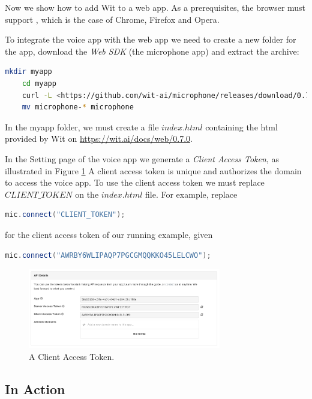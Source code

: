 \documentclass[twoside,11pt]{article}
\begin{document}
Now we show how to add Wit to a web app.
As a prerequisites, the browser must support \cite{webrtc}, which is the case of Chrome, Firefox and Opera.

To integrate the voice app with the web app we need to create a new folder for the app, download the \emph{Web SDK} (the microphone app) and extract the archive:
\begin{lstlisting}[language=bash]
	mkdir myapp
	cd myapp
	curl -L <https://github.com/wit-ai/microphone/releases/download/0.7.0/microphone-0.7.0.tar.gz | tar xvzf -
	mv microphone-* microphone
\end{lstlisting}

In the myapp folder, we must create a file $index.html$ containing the html provided by Wit on \url{https://wit.ai/docs/web/0.7.0}.

In the Setting page of the voice app we generate a \emph{Client Access Token}, as illustrated in Figure \ref{fig:token} 
A client access token is unique and authorizes the domain to access the voice app. 
To use the client access token we must replace $CLIENT\_TOKEN$ on the $index.html$ file.
For example, replace 
\begin{lstlisting}[language=java]
	mic.connect("CLIENT_TOKEN");
\end{lstlisting}
for the client access token of our running example, given
\begin{lstlisting}[language=java]
	mic.connect("AWRBY6WLIPAQP7PGCGMQQKKO45LELCWO");
\end{lstlisting}

\begin{figure}[!h]
\begin{center}
    \includegraphics[width=0.75\textwidth]{figures/token.png}
    \caption{A Client Access Token.}
    \label{fig:token}
\end{center}
\end{figure}


\subsection{In Action}
\end{document}
